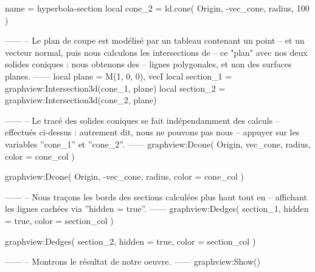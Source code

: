 \documentclass{standalone}
\begin{document}
\begin{luadraw*}{name = hyperbola-section}
local cone_2 = ld.cone(
  Origin,  -vec_cone, radius,
  100
)

------
-- Le plan de coupe est modélisé par un tableau contenant un point
-- et un vecteur normal, puis nous calculons les intersections de
-- ce "plan" avec nos deux solides coniques : nous obtenons des
-- lignes polygonales, et non des surfaces planes.
------
local plane     = {M(1, 0, 0), vecI}
local section_1 = graphview:Intersection3d(cone_1, plane)
local section_2 = graphview:Intersection3d(cone_2, plane)

------
-- Le tracé des solides coniques se fait indépendamment des calculs
-- effectués ci-dessus : autrement dit, nous ne pouvons pas nous
-- appuyer sur les variables ''cone_1'' et ''cone_2''.
------
graphview:Dcone(
  Origin, vec_cone, radius,
  {
    color = cone_col
  }
)

graphview:Dcone(
  Origin, -vec_cone, radius,
  {
    color = cone_col
  }
)

------
-- Nous traçons les bords des sections calculées plus haut tout en
-- affichant les lignes cachées via ''hidden = true''.
------
graphview:Dedges(
  section_1,
  {
    hidden = true,
    color = section_col
  }
)

graphview:Dedges(
  section_2,
  {
    hidden = true,
    color = section_col
  }
)

------
-- Montrons le résultat de notre oeuvre.
------
graphview:Show()
\end{luadraw*}
\end{document}
